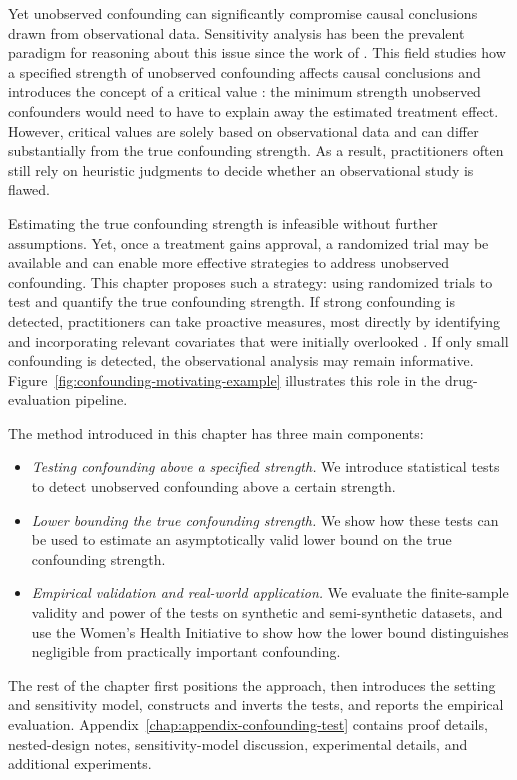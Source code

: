 Yet unobserved confounding can significantly compromise causal conclusions drawn from observational data. Sensitivity analysis has been the prevalent paradigm for reasoning about this issue since the work of \citet{cornfield59}. This field studies how a specified strength of unobserved confounding affects causal conclusions and introduces the concept of a critical value \citep{vanderweele2017sensitivity,jin2023sensitivity}: the minimum strength unobserved confounders would need to have to explain away the estimated treatment effect. However, critical values are solely based on observational data and can differ substantially from the true confounding strength. As a result, practitioners often still rely on heuristic judgments to decide whether an observational study is flawed.

Estimating the true confounding strength is infeasible without further assumptions. Yet, once a treatment gains approval, a randomized trial may be available and can enable more effective strategies to address unobserved confounding. This chapter proposes such a strategy: using randomized trials to test and quantify the true confounding strength. If strong confounding is detected, practitioners can take proactive measures, most directly by identifying and incorporating relevant covariates that were initially overlooked \citep{dreyer2018advancing}. If only small confounding is detected, the observational analysis may remain informative. Figure~\ref{fig:confounding-motivating-example} illustrates this role in the drug-evaluation pipeline.

The method introduced in this chapter has three main components:
\begin{itemize}
  \item \textit{Testing confounding above a specified strength.} We introduce statistical tests to detect unobserved confounding above a certain strength.
  \item \textit{Lower bounding the true confounding strength.} We show how these tests can be used to estimate an asymptotically valid lower bound on the true confounding strength.
  \item \textit{Empirical validation and real-world application.} We evaluate the finite-sample validity and power of the tests on synthetic and semi-synthetic datasets, and use the Women's Health Initiative to show how the lower bound distinguishes negligible from practically important confounding.
\end{itemize}

The rest of the chapter first positions the approach, then introduces the setting and sensitivity model, constructs and inverts the tests, and reports the empirical evaluation. Appendix~\ref{chap:appendix-confounding-test} contains proof details, nested-design notes, sensitivity-model discussion, experimental details, and additional experiments.

